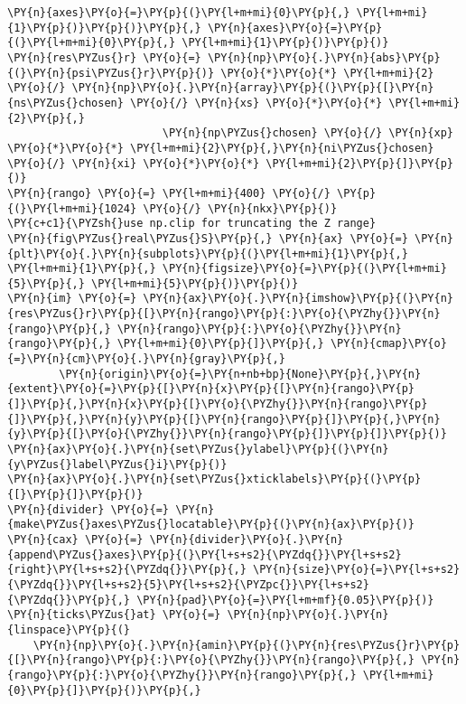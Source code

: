 \begin{Verbatim}[commandchars=\\\{\}]
        \PY{n}{axes}\PY{o}{=}\PY{p}{(}\PY{l+m+mi}{0}\PY{p}{,} \PY{l+m+mi}{1}\PY{p}{)}\PY{p}{)}\PY{p}{,} \PY{n}{axes}\PY{o}{=}\PY{p}{(}\PY{l+m+mi}{0}\PY{p}{,} \PY{l+m+mi}{1}\PY{p}{)}\PY{p}{)}
\PY{n}{res\PYZus{}r} \PY{o}{=} \PY{n}{np}\PY{o}{.}\PY{n}{abs}\PY{p}{(}\PY{n}{psi\PYZus{}r}\PY{p}{)} \PY{o}{*}\PY{o}{*} \PY{l+m+mi}{2} \PY{o}{/} \PY{n}{np}\PY{o}{.}\PY{n}{array}\PY{p}{(}\PY{p}{[}\PY{n}{ns\PYZus{}chosen} \PY{o}{/} \PY{n}{xs} \PY{o}{*}\PY{o}{*} \PY{l+m+mi}{2}\PY{p}{,}
                        \PY{n}{np\PYZus{}chosen} \PY{o}{/} \PY{n}{xp} \PY{o}{*}\PY{o}{*} \PY{l+m+mi}{2}\PY{p}{,}\PY{n}{ni\PYZus{}chosen} \PY{o}{/} \PY{n}{xi} \PY{o}{*}\PY{o}{*} \PY{l+m+mi}{2}\PY{p}{]}\PY{p}{)}
\PY{n}{rango} \PY{o}{=} \PY{l+m+mi}{400} \PY{o}{/} \PY{p}{(}\PY{l+m+mi}{1024} \PY{o}{/} \PY{n}{nkx}\PY{p}{)}
\PY{c+c1}{\PYZsh{}use np.clip for truncating the Z range}
\PY{n}{fig\PYZus{}real\PYZus{}S}\PY{p}{,} \PY{n}{ax} \PY{o}{=} \PY{n}{plt}\PY{o}{.}\PY{n}{subplots}\PY{p}{(}\PY{l+m+mi}{1}\PY{p}{,} \PY{l+m+mi}{1}\PY{p}{,} \PY{n}{figsize}\PY{o}{=}\PY{p}{(}\PY{l+m+mi}{5}\PY{p}{,} \PY{l+m+mi}{5}\PY{p}{)}\PY{p}{)}
\PY{n}{im} \PY{o}{=} \PY{n}{ax}\PY{o}{.}\PY{n}{imshow}\PY{p}{(}\PY{n}{res\PYZus{}r}\PY{p}{[}\PY{n}{rango}\PY{p}{:}\PY{o}{\PYZhy{}}\PY{n}{rango}\PY{p}{,} \PY{n}{rango}\PY{p}{:}\PY{o}{\PYZhy{}}\PY{n}{rango}\PY{p}{,} \PY{l+m+mi}{0}\PY{p}{]}\PY{p}{,} \PY{n}{cmap}\PY{o}{=}\PY{n}{cm}\PY{o}{.}\PY{n}{gray}\PY{p}{,}
        \PY{n}{origin}\PY{o}{=}\PY{n+nb+bp}{None}\PY{p}{,}\PY{n}{extent}\PY{o}{=}\PY{p}{[}\PY{n}{x}\PY{p}{[}\PY{n}{rango}\PY{p}{]}\PY{p}{,}\PY{n}{x}\PY{p}{[}\PY{o}{\PYZhy{}}\PY{n}{rango}\PY{p}{]}\PY{p}{,}\PY{n}{y}\PY{p}{[}\PY{n}{rango}\PY{p}{]}\PY{p}{,}\PY{n}{y}\PY{p}{[}\PY{o}{\PYZhy{}}\PY{n}{rango}\PY{p}{]}\PY{p}{]}\PY{p}{)}
\PY{n}{ax}\PY{o}{.}\PY{n}{set\PYZus{}ylabel}\PY{p}{(}\PY{n}{y\PYZus{}label\PYZus{}i}\PY{p}{)}
\PY{n}{ax}\PY{o}{.}\PY{n}{set\PYZus{}xticklabels}\PY{p}{(}\PY{p}{[}\PY{p}{]}\PY{p}{)}
\PY{n}{divider} \PY{o}{=} \PY{n}{make\PYZus{}axes\PYZus{}locatable}\PY{p}{(}\PY{n}{ax}\PY{p}{)}
\PY{n}{cax} \PY{o}{=} \PY{n}{divider}\PY{o}{.}\PY{n}{append\PYZus{}axes}\PY{p}{(}\PY{l+s+s2}{\PYZdq{}}\PY{l+s+s2}{right}\PY{l+s+s2}{\PYZdq{}}\PY{p}{,} \PY{n}{size}\PY{o}{=}\PY{l+s+s2}{\PYZdq{}}\PY{l+s+s2}{5}\PY{l+s+s2}{\PYZpc{}}\PY{l+s+s2}{\PYZdq{}}\PY{p}{,} \PY{n}{pad}\PY{o}{=}\PY{l+m+mf}{0.05}\PY{p}{)}
\PY{n}{ticks\PYZus{}at} \PY{o}{=} \PY{n}{np}\PY{o}{.}\PY{n}{linspace}\PY{p}{(}
    \PY{n}{np}\PY{o}{.}\PY{n}{amin}\PY{p}{(}\PY{n}{res\PYZus{}r}\PY{p}{[}\PY{n}{rango}\PY{p}{:}\PY{o}{\PYZhy{}}\PY{n}{rango}\PY{p}{,} \PY{n}{rango}\PY{p}{:}\PY{o}{\PYZhy{}}\PY{n}{rango}\PY{p}{,} \PY{l+m+mi}{0}\PY{p}{]}\PY{p}{)}\PY{p}{,}

\end{Verbatim}
